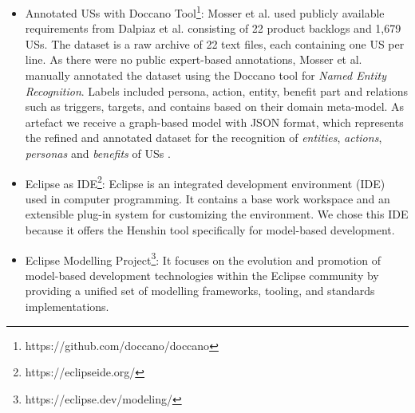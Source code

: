\begin{itemize}
	\item Annotated USs with Doccano Tool\footnote{https://github.com/doccano/doccano}: Mosser et al. used publicly available requirements from Dalpiaz et al.\cite{Dalpiaz2018} consisting of 22 product backlogs and 1,679 USs. The dataset is a raw archive of 22 text files, each containing one US per line. As there were no public expert-based annotations, Mosser et al. manually annotated the dataset using the Doccano tool for \textit{Named Entity Recognition}. Labels included persona, action, entity, benefit part and relations such as triggers, targets, and contains based on their domain meta-model.%
	As artefact we receive a graph-based model with JSON format, which represents the refined and annotated dataset for the recognition of \emph{entities}, \emph{actions}, \emph{personas} and \emph{benefits} of USs \cite{mosser2022modelling}.
	
	
	\item Eclipse as IDE\footnote{https://eclipseide.org/}: Eclipse is an integrated development environment (IDE) used in computer programming. It contains a base work workspace and an extensible plug-in system for customizing the environment.
	We chose this IDE because it offers the Henshin tool specifically for model-based development.
	
	\item Eclipse Modelling Project\footnote{https://eclipse.dev/modeling/}: It focuses on the evolution and promotion of model-based development technologies within the Eclipse community by providing a unified set of modelling frameworks, tooling, and standards implementations.
	

\end{itemize}
